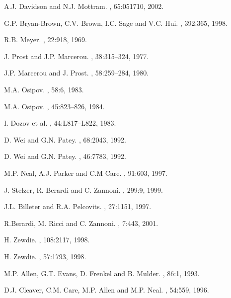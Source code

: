\documentclass[%
reprint,
superscriptaddress,
showpacs,
 amsmath,amssymb,
 aps,
floatfix,
]{revtex4-1}
\begin{document}
\begin{thebibliography}{10}

{A.J. Davidson and N.J. Mottram}.
, 65:051710, 2002.

{G.P. Bryan-Brown, C.V. Brown, I.C. Sage and V.C. Hui}.
, 392:365, 1998.

{R.B. Meyer}.
, 22:918, 1969.

{J. Prost and J.P. Marcerou}.
, 38:315--324, 1977.

{J.P. Marcerou and J. Prost}.
, 58:259--284, 1980.

{M.A. Osipov}.
, 58:6, 1983.

{M.A. Osipov}.
, 45:823--826, 1984.

{I. Dozov et al.}
, 44:L817--L822, 1983.

{D. Wei and G.N. Patey}.
, 68:2043, 1992.

{D. Wei and G.N. Patey}.
, 46:7783, 1992.

{M.P. Neal, A.J. Parker and C.M Care}.
, 91:603, 1997.

{J. Stelzer, R. Berardi and C. Zannoni}.
, 299:9, 1999.

{J.L. Billeter and R.A. Pelcovits}.
, 27:1151, 1997.

{R.Berardi, M. Ricci and C. Zannoni}.
, 7:443, 2001.

{H. Zewdie}.
, 108:2117, 1998.

{H. Zewdie}.
, 57:1793, 1998.

{M.P. Allen, G.T. Evans, D. Frenkel and B. Mulder}.
, 86:1, 1993.

{D.J. Cleaver, C.M. Care, M.P. Allen and M.P. Neal}.
, 54:559, 1996.


\end{thebibliography}
\end{document}
